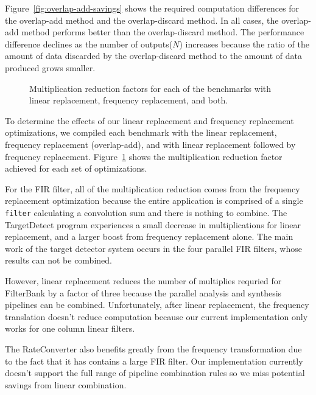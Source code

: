Figure~\ref{fig:overlap-add-savings} shows the required computation differences for
the overlap-add method and the overlap-discard method. 
In all cases, the overlap-add method performs better than the overlap-discard method.
The performance difference declines as the number of outputs($N$) increases because
the ratio of the amount of data discarded by the overlap-discard method to the 
amount of data produced grows smaller. 

\begin{figure}
\center
\epsfxsize=3.2in
\vspace{-6pt}
\caption{Multiplication reduction factors for each of the benchmarks with linear replacement, frequency replacement, and both.}
\label{fig:linear-freq-both}
\vspace{-12pt}
\end{figure}

To determine the effects of our linear replacement and frequency replacement 
optimizations, we compiled each benchmark with the linear 
replacement, frequency replacement (overlap-add),
and with linear replacement followed by frequency replacement. 
Figure~\ref{fig:linear-freq-both} shows the multiplication reduction factor 
achieved for each set of optimizations.

For the FIR filter, all of the multiplication reduction comes from the frequency
replacement optimization because the entire application is comprised of a single
{\tt filter} calculating a convolution sum and there is nothing to combine.
The TargetDetect program experiences a small decrease in multiplications 
for linear replacement, and a larger boost from frequency replacement alone.
The main work of the target detector system occurs in the four parallel FIR filters, whose
results can not be combined.

However, linear replacement reduces the number of multiplies 
requried for FilterBank by a factor of three because the parallel analysis and 
synthesis pipelines can be combined. Unfortunately, after
linear replacement, the frequency translation doesn't reduce computation 
because our current implementation only works for one column linear filters.

The RateConverter also benefits greatly from the frequency transformation
due to the fact that it has contains a large FIR filter. Our implementation
currently doesn't support the full range of pipeline combination rules so
we miss potential savings from linear combination.

